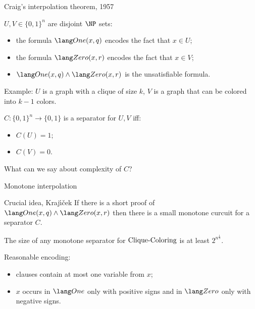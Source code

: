 \begin{frame}{Craig's interpolation theorem, 1957}

    $U, V \in \{0, 1\}^n$ are disjoint $\NP$ sets:
    \begin{itemize}
        \item the formula $\One(x, q)$ encodes the fact that $x \in U$;
        \item the formula $\Zero(x, r)$ encodes the fact that $x \in V$;
        \item $\One(x, q) \land \Zero(x, r)$ is the unsatisfiable formula.
            
    \end{itemize}

    \vspace{0.2cm}
    \pause
    Example: $U$ is a graph with a clique of size $k$, $V$ is a graph that can be colored into $k - 1$
    colors.

    \pause
    \begin{definition}
	    $C: \{0, 1\}^n \to \{0, 1\}$ is a separator for $U, V$ iff:
        \begin{itemize}
            \item $C(U) = 1$;
            \item $C(V) = 0$.
        \end{itemize}        
    \end{definition}

    \pause
	What can we say about complexity of $C$?

\end{frame}


\begin{frame}{Monotone interpolation}

    \begin{block}{Crucial idea, Kraj{\'{\i}}{\v{c}}ek}
        If there is a short proof of $\One(x, q) \land \Zero(x, r)$ then there is a small
        \alert{monotone} {\color{blue} curcuit} for a separator $C$.
    \end{block}

    \begin{theorem}
        The size of any monotone separator for $\mathrm{Clique}\text{-}\mathrm{Coloring}$ is at least $2^{n^{\frac{1}{4}}}$.
    \end{theorem}

    \pause
    Reasonable encoding:
    \begin{itemize}
        \item clauses contain at most one variable from $x$;
        \item $x$ occurs in $\One$ only with positive signs and in $\Zero$ only with negative signs.
    \end{itemize}
\end{frame}

